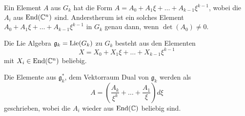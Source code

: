 Ein Element $A$ aus $G_k$ hat die Form $A=A_0+A_1\xi+\dots+A_{k-1}\xi^{k-1}$,
wobei die $A_i$ aus $\operatorname{End}(\mathbb{C}^n)$ sind. Anderstherum ist ein solches Element
$A_0+A_1\xi+\dots+A_{k-1}\xi^{k-1}$ in $G_k$ genau dann, wenn $\det(A_0)\neq0$.
\begin{comment}
Zu Zeigen: $\det(\sum^{k-1}_{i=0}A_{i}\xi^{i})\neq 0$ $\Leftrightarrow$
$\det(A_0)\neq0$.\\
\textbf{Denn} $\det(\sum^{k-1}_{i=0}A_{i}\xi^{i})=\overset{\text{\color{red}?}}\dots
=\det(A_0)$.
\end{comment}
Die Lie Algebra $\mathfrak g_k=\operatorname{Lie}(G_k)$ zu $G_k$ besteht aus den Elementen
\[
X=X_0+X_1\xi+\dots+X_{k-1}\xi^{k-1}
\]
mit $X_i\in\operatorname{End}(\mathbb{C}^n)$ beliebig.
\begin{comment}
Dazu: \TODO
\end{comment}
Die Elemente aus $\mathfrak g_k^*$, dem Vektorraum Dual von $\mathfrak g_k$
werden als
\[
A=\left(\frac{A_{k}}{\xi^{k}}+\dots+\frac{A_{1}}{\xi}\right)d\xi
\]
geschrieben, wobei die $A_i$ wieder aus $\operatorname{End}(\mathbb{C})$ beliebig sind. 
\begin{comment}
\ccite[p. 22]{thboalch}
Die Paarung zwischen $\mathfrak g_k^*$ und $\mathfrak g_k$ ist gegeben durch
\[
<A,X>=\Res_0(\Tr(AX))=\sum^{k}_{i=1}\Tr(A_iX_{i-1})
\]
Wobei $\Res_0$ die Residuen Abbildung ist, welche den Koeffizient vor
$d\xi/\xi$ ausgibt.
\textbf{Observe that the product $AX$ is a well defined element of $\mathfrak
g_k^∗$, where $A\in\mathfrak g_k^*$ and $X\in\mathfrak g_k$.}
Ähnlich ist das Produkt $XA$ wohldefiniert in $\mathfrak g_k^∗$. Damit ist
$\mathfrak g_k^*$ ein Bimodul über $\mathfrak g_k$.
\end{comment}

